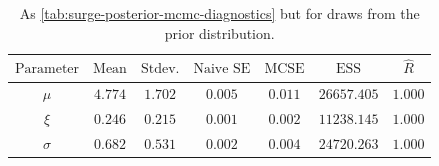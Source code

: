 \documentclass[ef,draft]{agutexSI2019}
\begin{document}
\begin{table}[h]
    \centering
    \caption{As \cref{tab:surge-posterior-mcmc-diagnostics} but for draws from the prior distribution.}\label{tab:surge-prior-mcmc-diagnostics}
    \begin{tabular}{ccccccc}
        \toprule
        $\textrm{Parameter}$ & $\textrm{Mean}$ & $\textrm{Stdev.}$ & $\textrm{Naive SE}$ & $\textrm{MCSE}$ & $\textrm{ESS}$ & $\hat{R}$ \\
        \midrule
        $\mu$                & $4.774$         & $1.702$           & $0.005$             & $0.011$         & $26657.405$    & $1.000$   \\
        $\xi$                & $0.246$         & $0.215$           & $0.001$             & $0.002$         & $11238.145$    & $1.000$   \\
        $\sigma$             & $0.682$         & $0.531$           & $0.002$             & $0.004$         & $24720.263$    & $1.000$   \\
        \bottomrule
    \end{tabular}

\end{table}
\end{document}
